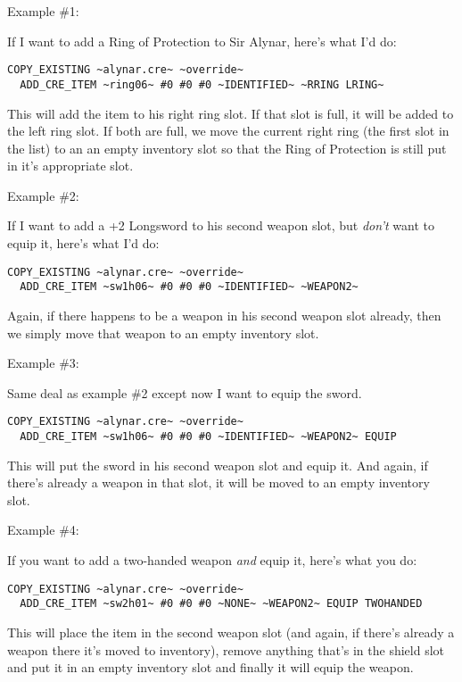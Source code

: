 \documentclass{article}
\begin{document}
Example \#1:

If I want to add a Ring of Protection to Sir Alynar, here's what I'd do:

\begin{verbatim}
COPY_EXISTING ~alynar.cre~ ~override~
  ADD_CRE_ITEM ~ring06~ #0 #0 #0 ~IDENTIFIED~ ~RRING LRING~
\end{verbatim}

This will add the item to his right ring slot. If that slot is full, it
will be added to the left ring slot. If both are full, we move the current
right ring (the first slot in the list) to an an empty inventory slot so
that the Ring of Protection is still put in it's appropriate slot.

Example \#2:

If I want to add a +2 Longsword to his second weapon slot, but \emph{don't}
want to equip it, here's what I'd do:

\begin{verbatim}
COPY_EXISTING ~alynar.cre~ ~override~
  ADD_CRE_ITEM ~sw1h06~ #0 #0 #0 ~IDENTIFIED~ ~WEAPON2~
\end{verbatim}

Again, if there happens to be a weapon in his second weapon slot already,
then we simply move that weapon to an empty inventory slot.

Example \#3:

Same deal as example \#2 except now I want to equip the sword.

\begin{verbatim}
COPY_EXISTING ~alynar.cre~ ~override~
  ADD_CRE_ITEM ~sw1h06~ #0 #0 #0 ~IDENTIFIED~ ~WEAPON2~ EQUIP
\end{verbatim}

This will put the sword in his second weapon slot and equip it.  And again,
if there's already a weapon in that slot, it will be moved to an empty
inventory slot.

Example \#4:

If you want to add a two-handed weapon \emph{and} equip it, here's what you do:

\begin{verbatim}
COPY_EXISTING ~alynar.cre~ ~override~
  ADD_CRE_ITEM ~sw2h01~ #0 #0 #0 ~NONE~ ~WEAPON2~ EQUIP TWOHANDED
\end{verbatim}

This will place the item in the second weapon slot (and again, if there's
already a weapon there it's moved to inventory), remove anything that's in
the shield slot and put it in an empty inventory slot and finally it will
equip the weapon.
\end{document}
